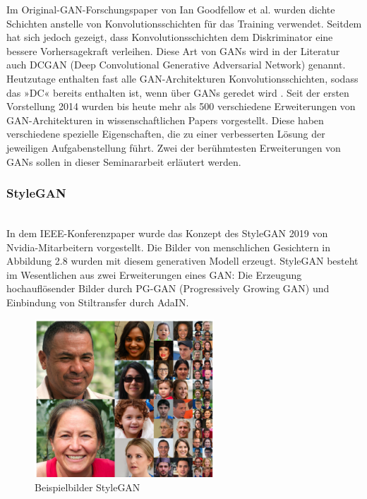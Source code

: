 Im Original-GAN-Forschungspaper von Ian Goodfellow et al. wurden dichte Schichten anstelle von Konvolutionsschichten für das Training verwendet. Seitdem hat sich jedoch gezeigt, dass Konvolutionsschichten dem Diskriminator eine bessere Vorhersagekraft verleihen. Diese Art von GANs wird in der Literatur auch DCGAN (Deep Convolutional Generative Adversarial Network) genannt. Heutzutage enthalten fast alle GAN-Architekturen Konvolutionsschichten, sodass das »DC« bereits enthalten ist, wenn über GANs geredet wird \cite{bro19}. Seit der ersten Vorstellung 2014 wurden bis heute mehr als 500 verschiedene Erweiterungen von GAN-Architekturen in wissenschaftlichen Papers vorgestellt. Diese haben verschiedene spezielle Eigenschaften, die zu einer verbesserten Lösung der jeweiligen Aufgabenstellung führt. Zwei der berühmtesten Erweiterungen von GANs sollen in dieser Seminararbeit erläutert werden.

\subsubsection{StyleGAN}~\\
In dem IEEE-Konferenzpaper \emph{\flqq} wurde das Konzept des StyleGAN 2019 von Nvidia-Mitarbeitern vorgestellt. Die Bilder von menschlichen Gesichtern in Abbildung 2.8 wurden mit diesem generativen Modell erzeugt. StyleGAN besteht im Wesentlichen aus zwei Erweiterungen eines GAN:
Die Erzeugung hochauflösender Bilder durch PG-GAN (Progressively Growing GAN) und Einbindung von Stiltransfer durch AdaIN.
\begin{figure}[H]
    \centering
    \includegraphics[width=0.6\textwidth,angle=0]{abb/StyleGAN_example_2}
    \caption[Beispielbilder StyleGAN]{Beispielbilder StyleGAN \cite{kar19}}
\end{figure}

